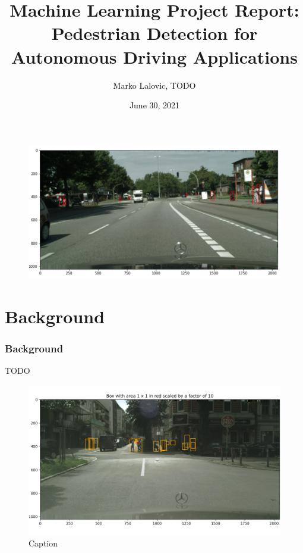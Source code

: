 \documentclass[10pt, xcolor={dvipsnames}]{beamer}
\title[Pedestrian Detection]{Machine Learning Project Report:
Pedestrian Detection for Autonomous Driving Applications}
\author[\textcolor{white}{Marko Lalovic, TODO}]{\textcolor{black}{Marko Lalovic, TODO}}
\date[\textcolor{white}{June 30, 2021}]{\textcolor{black}{June 30, 2021}}
\begin{document}
\begin{frame}
\begin{center}
\maketitle
\begin{figure}
    \includegraphics[width=\linewidth]{../figures/project.png}
\end{figure}
\end{center}
\end{frame}



\section{Background}
\begin{frame}
\frametitle{Background}
TODO
\begin{center}
\begin{figure}
    \includegraphics[width=.8\linewidth]{../figures/small-bbox-example.png}
    \caption{Caption}
\end{figure}
\end{center}
\end{frame}
\end{document}
